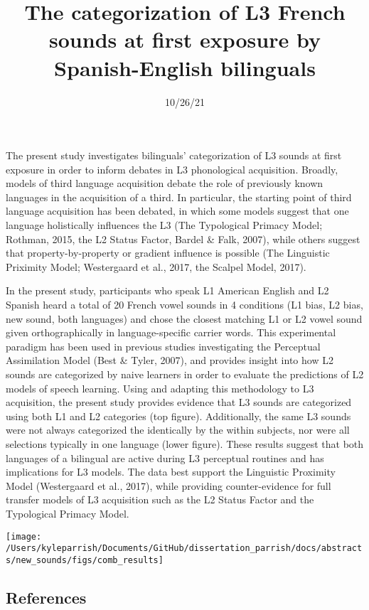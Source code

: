 \documentclass[
  12pt,
]{article}
\title{The categorization of L3 French sounds at first exposure by
Spanish-English bilinguals}
\author{}
\date{\vspace{-2.5em}10/26/21}
\begin{document}
\maketitle

The present study investigates bilinguals' categorization of L3 sounds
at first exposure in order to inform debates in L3 phonological
acquisition. Broadly, models of third language acquisition debate the
role of previously known languages in the acquisition of a third. In
particular, the starting point of third language acquisition has been
debated, in which some models suggest that one language holistically
influences the L3 (The Typological Primacy Model; Rothman, 2015, the L2
Status Factor, Bardel \& Falk, 2007), while others suggest that
property-by-property or gradient influence is possible (The Linguistic
Priximity Model; Westergaard et al., 2017, the Scalpel Model, 2017).

In the present study, participants who speak L1 American English and L2
Spanish heard a total of 20 French vowel sounds in 4 conditions (L1
bias, L2 bias, new sound, both languages) and chose the closest matching
L1 or L2 vowel sound given orthographically in language-specific carrier
words. This experimental paradigm has been used in previous studies
investigating the Perceptual Assimilation Model (Best \& Tyler, 2007),
and provides insight into how L2 sounds are categorized by naive
learners in order to evaluate the predictions of L2 models of speech
learning. Using and adapting this methodology to L3 acquisition, the
present study provides evidence that L3 sounds are categorized using
both L1 and L2 categories (top figure). Additionally, the same L3 sounds
were not always categorized the identically by the within subjects, nor
were all selections typically in one language (lower figure). These
results suggest that both languages of a bilingual are active during L3
perceptual routines and has implications for L3 models. The data best
support the Linguistic Proximity Model (Westergaard et al., 2017), while
providing counter-evidence for full transfer models of L3 acquisition
such as the L2 Status Factor and the Typological Primacy Model.

\newpage

\texttt{[image: /Users/kyleparrish/Documents/GitHub/dissertation\_parrish/docs/abstracts/new\_sounds/figs/comb\_results]}

\hypertarget{references}{%
\subsection{References}\label{references}}
\end{document}
